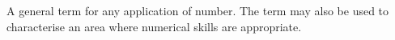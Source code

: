 A general term for any application of number. The term may also be used to characterise an area where numerical skills are appropriate.
  